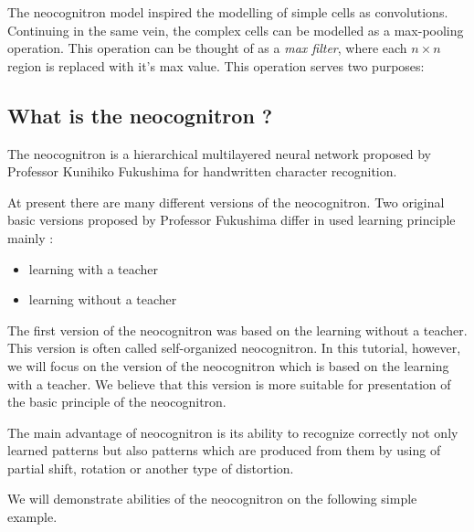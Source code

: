 \documentclass[a4paper,12pt]{report}%
\begin{document}
The neocognitron model inspired the modelling of simple cells as convolutions. Continuing in the same vein, the complex cells can be modelled as a max-pooling operation. This operation can be thought of as a {\it max filter}, where each $n \times n$ region is replaced with it's max value. This operation serves two purposes:

\subsection{What is the neocognitron ?}


The neocognitron is a hierarchical multilayered neural network proposed by Professor Kunihiko Fukushima for handwritten character recognition.

At present there are many different versions of the neocognitron. Two original basic versions proposed by Professor Fukushima differ in used learning principle mainly :
\begin{itemize}
  \item learning with a teacher
  \item learning without a teacher
\end{itemize}

The first version of the neocognitron was based on the learning without a teacher. This version is often called self-organized neocognitron. In this tutorial, however, we will focus on the version of the neocognitron which is based on the learning with a teacher. We believe that this version is more suitable for presentation of the basic principle of the neocognitron.

The main advantage of neocognitron is its ability to recognize correctly not only learned patterns but also patterns which are produced from them by using of partial shift, rotation or another type of distortion.

We will demonstrate abilities of the neocognitron on the following simple example.
\end{document}
